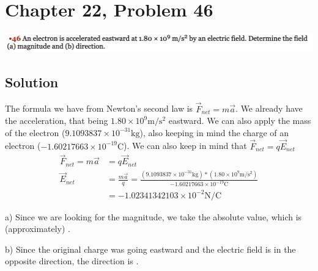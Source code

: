\documentclass[12pt]{article}
\begin{document}
\pagebreak
\section*{Chapter 22, Problem 46}
\includegraphics[width=\textwidth]{picture_7.png}

\subsection*{Solution}
The formula we have from Newton's second law is $\vec{F}_{net} = m\vec{a}$. We already have the acceleration, that being $1.80 \times 10^9 \unit{\meter/\second^2}$ eastward. We can also apply the mass of the electron ($9.1093837 \times 10^{-31} \unit{\kilo\gram}$), also keeping in mind the charge of an electron ($-1.60217663 \times 10^{-19} \unit{\coulomb}$). We can also keep in mind that $\vec{F}_{net} = q \vec{E}_{net}$
\begin{align*}
    \vec{F}_{net}   =   m\vec{a}
        &=  q \vec{E}_{net}\\
    \vec{E}_{net}   &=  \frac{m\vec{a}}{q}
        =   \frac{(9.1093837 \times 10^{-31} \unit{\kilo\gram})*(1.80 \times 10^9 \unit{\meter/\second^2})}{-1.60217663 \times 10^{-19} \unit{\coulomb}}\\
        &=  -1.02341342103 \times 10^{-2} \unit{\newton/\coulomb}
\end{align*}

a) Since we are looking for the magnitude, we take the absolute value, which is (approximately) .

b) Since the original charge was going eastward and the electric field is in the opposite direction, the direction is .
\end{document}
